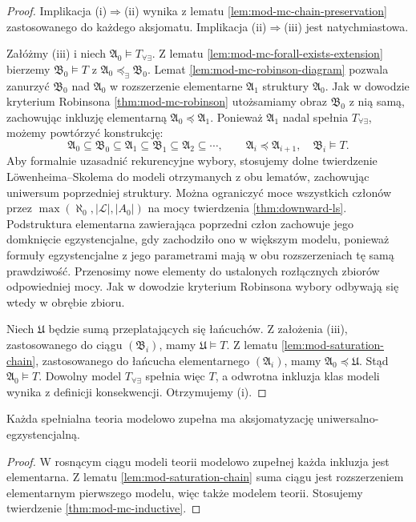 \begin{proof}
Implikacja (i)$\Rightarrow$(ii) wynika z lematu
\ref{lem:mod-mc-chain-preservation} zastosowanego
do każdego aksjomatu. Implikacja (ii)$\Rightarrow$(iii)
jest natychmiastowa.

Załóżmy (iii) i niech
$\mathfrak A_0\models T_{\forall\exists}$.
Z lematu \ref{lem:mod-mc-forall-exists-extension}
bierzemy $\mathfrak B_0\models T$ z
$\mathfrak A_0\preccurlyeq_{\exists}\mathfrak B_0$.
Lemat \ref{lem:mod-mc-robinson-diagram} pozwala
zanurzyć $\mathfrak B_0$ nad $\mathfrak A_0$
w rozszerzenie elementarne $\mathfrak A_1$ struktury
$\mathfrak A_0$. Jak w dowodzie kryterium Robinsona
\ref{thm:mod-mc-robinson} utożsamiamy obraz
$\mathfrak B_0$ z nią samą, zachowując inkluzję
elementarną $\mathfrak A_0\preccurlyeq\mathfrak A_1$.
Ponieważ $\mathfrak A_1$ nadal spełnia
$T_{\forall\exists}$, możemy powtórzyć konstrukcję:
\[
\mathfrak A_0\subseteq\mathfrak B_0
\subseteq\mathfrak A_1\subseteq\mathfrak B_1
\subseteq\mathfrak A_2\subseteq\cdots,
\qquad
\mathfrak A_i\preccurlyeq\mathfrak A_{i+1},
\quad \mathfrak B_i\models T.
\]
Aby formalnie uzasadnić rekurencyjne wybory,
stosujemy dolne twierdzenie Löwenheima--Skolema
do modeli otrzymanych z obu lematów, zachowując
uniwersum poprzedniej struktury. Można ograniczyć
moce wszystkich członów przez
$\max(\aleph_0,|\mathcal L|,|A_0|)$ na mocy
twierdzenia \ref{thm:downward-ls}.
Podstruktura elementarna zawierająca poprzedni
człon zachowuje jego domknięcie egzystencjalne,
gdy zachodziło ono w większym modelu, ponieważ
formuły egzystencjalne z jego parametrami mają
w obu rozszerzeniach tę samą prawdziwość.
Przenosimy nowe elementy do ustalonych rozłącznych
zbiorów odpowiedniej mocy. Jak w dowodzie kryterium
Robinsona wybory odbywają się wtedy w obrębie zbioru.

Niech $\mathfrak U$ będzie sumą przeplatających
się łańcuchów. Z założenia (iii), zastosowanego
do ciągu $(\mathfrak B_i)$, mamy $\mathfrak U\models T$.
Z lematu \ref{lem:mod-saturation-chain}, zastosowanego
do łańcucha elementarnego $(\mathfrak A_i)$,
mamy $\mathfrak A_0\preccurlyeq\mathfrak U$.
Stąd $\mathfrak A_0\models T$. Dowolny model
$T_{\forall\exists}$ spełnia więc $T$, a odwrotna
inkluzja klas modeli wynika z definicji konsekwencji.
Otrzymujemy (i).
\end{proof}

\begin{wniosek}
\label{cor:mod-mc-inductive}
Każda spełnialna teoria modelowo zupełna ma
aksjomatyzację uniwersalno-egzystencjalną.
\end{wniosek}
\begin{proof}
W rosnącym ciągu modeli teorii modelowo zupełnej
każda inkluzja jest elementarna. Z lematu
\ref{lem:mod-saturation-chain} suma ciągu jest
rozszerzeniem elementarnym pierwszego modelu,
więc także modelem teorii. Stosujemy twierdzenie
\ref{thm:mod-mc-inductive}.
\end{proof}

